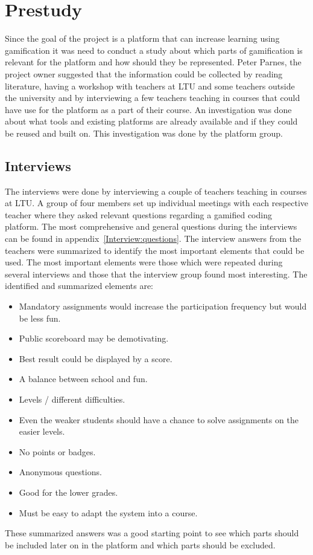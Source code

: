 \chapter{Prestudy} 
Since the goal of the project is a platform that can increase learning using gamification it was need to conduct a study about which parts of gamification is relevant for the platform and how should they be represented. Peter Parnes, the project owner suggested that the information could be collected by reading literature, having a workshop with teachers at LTU and some teachers outside the university and by interviewing a few teachers teaching in courses that could have use for the platform as a part of their course. An investigation was done about what tools and existing platforms are already available and if they could be reused and built on. This investigation was done by the platform group.

\section{Interviews}
The interviews were done by interviewing a couple of teachers teaching in courses at LTU. A group of four members set up individual meetings with each respective teacher where they asked relevant questions regarding a gamified coding platform. The most comprehensive and general questions during the interviews can be found in appendix~\ref{Interview:questions}. The interview answers from the teachers were summarized to identify the most important elements that could be used. The most important elements were those which were repeated during several interviews and those that the interview group found most interesting. The identified and summarized elements are:

 \begin{itemize}
 \item Mandatory assignments would increase the participation frequency but would be less fun.
 \item Public scoreboard may be demotivating.
 \item Best result could be displayed by a score.
 \item A balance between school and fun.
 \item Levels / different difficulties. 
 \item Even the weaker students should have a chance to solve assignments on the easier levels.
 \item No points or badges.
 \item Anonymous questions.
 \item Good for the lower grades.
 \item Must be easy to adapt the system into a course.
 \end{itemize}
These summarized answers was a good starting point to see which parts should be included later on in the platform and which parts should be excluded. 

